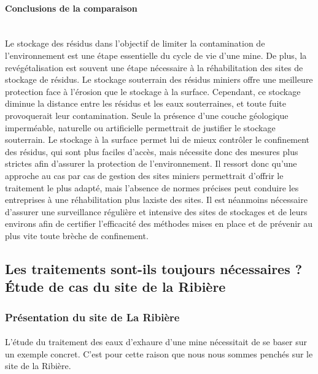\documentclass{article}
\begin{document}
\paragraph{Conclusions de la comparaison \\ \\}
Le stockage des résidus dans l’objectif de limiter la contamination de l’environnement est une étape essentielle du cycle de vie d’une mine.
De plus, la revégétalisation est souvent une étape nécessaire à la réhabilitation des sites de stockage de résidus.
Le stockage souterrain des résidus miniers offre une meilleure protection face à l’érosion que le stockage à la surface. Cependant, ce stockage diminue la distance entre les résidus et les eaux souterraines, et toute fuite provoquerait leur contamination. Seule la présence d’une couche géologique imperméable, naturelle ou artificielle permettrait de justifier le stockage souterrain. Le stockage à la surface permet lui de mieux contrôler le confinement des résidus, qui sont plus faciles d’accès, mais nécessite donc des mesures plus strictes afin d’assurer la protection de l’environnement.
Il ressort donc qu’une approche au cas par cas de gestion des sites miniers permettrait d’offrir le traitement le plus adapté, mais l’absence de normes précises peut conduire les entreprises à une réhabilitation plus laxiste des sites.
Il est néanmoins nécessaire d’assurer une surveillance régulière et intensive des sites de stockages et de leurs environs afin de certifier l’efficacité des méthodes mises en place et de prévenir au plus vite toute brèche de confinement.


\subsection{Les traitements sont-ils toujours nécessaires ?\\Étude de cas du site de la Ribière}%
\subsubsection{Présentation du site de La Ribière}
\paragraph{} L’étude du traitement des eaux d’exhaure d’une mine nécessitait de se baser sur un exemple concret. C’est pour cette raison que nous nous sommes penchés sur le site de la Ribière. 
\end{document}
